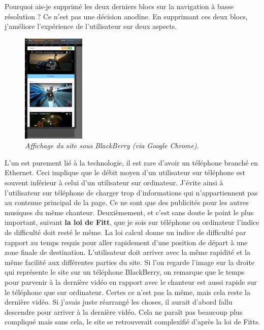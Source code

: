 \documentclass{article}
\begin{document}
\hspace*{0.6cm}Pourquoi ais-je supprim\'e les deux derniers blocs sur la navigation \`a basse r\'esolution ? Ce n'est pas une d\'ecision anodine. En supprimant ces deux blocs, j'am\'eliore l'exp\'erience de l'utilisateur sur deux aspects.\\
\begin{figure}
\vspace{-13pt}
\centering
\includegraphics[width=3cm]{blackberry}
\caption{\textit{Affichage du site sous BlackBerry (via Google Chrome).}}
\end{figure} 
{\hspace*{0.6cm}L'un est purement li\'e \`a la technologie, il est rare d'avoir un t\'el\'ephone branch\'e en Ethernet. Ceci implique que le d\'ebit moyen d'un utilisateur sur t\'el\'ephone est souvent inf\'erieur \`a celui d'un utilisateur sur ordinateur. J'\'evite ainsi \`a l'utilisateur sur t\'el\'ephone de charger trop d'informations qui n'appartiennent pas au contenue principal de la page. Ce ne sont que des publicit\'es pour les autres musiques du m\^eme chanteur. Deuxi\`emement, et c'est sans doute le point le plus important, suivant \textbf{la loi de Fitt}, que je sois sur t\'el\'ephone ou ordinateur l'indice de difficult\'e doit rest\'e le m\^eme. La loi calcul donne un indice de difficult\'e par rapport au temps requis pour aller rapidement d'une position de d\'epart \`a une zone finale de destination. L'utilisateur doit arriver avec la m\^eme rapidit\'e et la m\^eme facilit\'e aux diff\'erentes parties du site. Si l'on regarde l'image sur la droite qui repr\'esente le site sur un t\'el\'ephone BlackBerry, on remarque que le temps pour parvenir \`a la derni\`ere vid\'eo en rapport avec le chanteur est aussi rapide sur le t\'el\'ephone que sur ordinateur. Certes ce n'est pas la m\^eme, mais cela reste la derni\`ere vid\'eo. Si j'avais juste r\'earrang\'e les choses, il aurait d'abord fallu descendre pour arriver \`a la derni\`ere vid\'eo. Cela ne para\^it pas beaucoup plus compliqu\'e mais sans cela, le site se retrouverait complexifi\'e d'apr\`es la loi de Fitts.}\\
\end{document}
